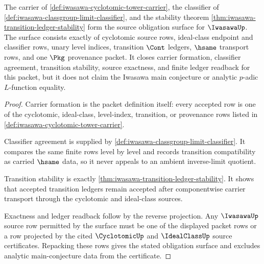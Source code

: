 \begin{theorem}
\label{thm:iwasawa-source-obligation-surface}
The carrier of \autoref{def:iwasawa-cyclotomic-tower-carrier}, the classifier
of \autoref{def:iwasawa-classgroup-limit-classifier}, and the stability theorem
\autoref{thm:iwasawa-transition-ledger-stability} form the source obligation
surface for $\IwasawaUp$. The surface consists exactly of cyclotomic source
rows, ideal-class endpoint and classifier rows, unary level indices, transition
$\Cont$ ledgers, $\hsame$ transport rows, and one $\Pkg$ provenance packet. It
closes carrier formation, classifier agreement, transition stability, source
exactness, and finite ledger readback for this packet, but it does not claim
the Iwasawa main conjecture or analytic $p$-adic $L$-function equality.
\end{theorem}
\begin{proof}
Carrier formation is the packet definition itself: every accepted row is one
of the cyclotomic, ideal-class, level-index, transition, or provenance rows
listed in \autoref{def:iwasawa-cyclotomic-tower-carrier}.

Classifier agreement is supplied by
\autoref{def:iwasawa-classgroup-limit-classifier}. It compares the same finite
rows level by level and records transition compatibility as carried $\hsame$
data, so it never appeals to an ambient inverse-limit quotient.

Transition stability is exactly
\autoref{thm:iwasawa-transition-ledger-stability}. It shows that accepted
transition ledgers remain accepted after componentwise carrier transport
through the cyclotomic and ideal-class sources.

Exactness and ledger readback follow by the reverse projection. Any
$\IwasawaUp$ source row permitted by the surface must be one of the displayed
packet rows or a row projected by the cited $\CyclotomicUp$ and $\IdealClassUp$
source certificates. Repacking these rows gives the stated obligation surface
and excludes analytic main-conjecture data from the certificate.
\end{proof}

